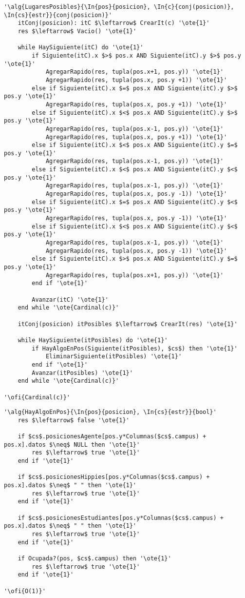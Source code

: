 \begin{lstlisting}[mathescape]
'\alg{LugaresPosibles}{\In{pos}{posicion}, \In{c}{conj(posicion)}, \In{cs}{estr}}{conj(posicion)}'
	itConj(posicion): itC $\leftarrow$ CrearIt(c) '\ote{1}'
	res $\leftarrow$ Vacio() '\ote{1}'

	while HaySiguiente(itC) do '\ote{1}'
		if Siguiente(itC).x $>$ pos.x AND Siguiente(itC).y $>$ pos.y '\ote{1}'
			AgregarRapido(res, tupla(pos.x+1, pos.y)) '\ote{1}'
			AgregarRapido(res, tupla(pos.x, pos.y +1)) '\ote{1}'
		else if Siguiente(itC).x $=$ pos.x AND Siguiente(itC).y $>$ pos.y '\ote{1}'
			AgregarRapido(res, tupla(pos.x, pos.y +1)) '\ote{1}'
		else if Siguiente(itC).x $<$ pos.x AND Siguiente(itC).y $>$ pos.y '\ote{1}'
			AgregarRapido(res, tupla(pos.x-1, pos.y)) '\ote{1}'
			AgregarRapido(res, tupla(pos.x, pos.y +1)) '\ote{1}'
		else if Siguiente(itC).x $<$ pos.x AND Siguiente(itC).y $=$ pos.y '\ote{1}'
			AgregarRapido(res, tupla(pos.x-1, pos.y)) '\ote{1}'
		else if Siguiente(itC).x $<$ pos.x AND Siguiente(itC).y $<$ pos.y '\ote{1}'
			AgregarRapido(res, tupla(pos.x-1, pos.y)) '\ote{1}'
			AgregarRapido(res, tupla(pos.x, pos.y -1)) '\ote{1}'
		else if Siguiente(itC).x $=$ pos.x AND Siguiente(itC).y $<$ pos.y '\ote{1}'
			AgregarRapido(res, tupla(pos.x, pos.y -1)) '\ote{1}'
		else if Siguiente(itC).x $<$ pos.x AND Siguiente(itC).y $<$ pos.y '\ote{1}'
			AgregarRapido(res, tupla(pos.x-1, pos.y)) '\ote{1}'
			AgregarRapido(res, tupla(pos.x, pos.y -1)) '\ote{1}'
		else if Siguiente(itC).x $>$ pos.x AND Siguiente(itC).y $=$ pos.y '\ote{1}'
			AgregarRapido(res, tupla(pos.x+1, pos.y)) '\ote{1}'
		end if '\ote{1}'

		Avanzar(itC) '\ote{1}'
	end while '\ote{Cardinal(c)}'

	itConj(posicion) itPosibles $\leftarrow$ CrearIt(res) '\ote{1}'

	while HaySiguiente(itPosibles) do '\ote{1}'
		if HayAlgoEnPos(Siguiente(itPosibles), $cs$) then '\ote{1}'
			EliminarSiguiente(itPosibles) '\ote{1}'
		end if '\ote{1}'
		Avanzar(itPosibles) '\ote{1}'
	end while '\ote{Cardinal(c)}'

'\ofi{Cardinal(c)}'
\end{lstlisting}

\begin{lstlisting}[mathescape]
'\alg{HayAlgoEnPos}{\In{pos}{posicion}, \In{cs}{estr}}{bool}'
	res $\leftarrow$ false '\ote{1}'

	if $cs$.posicionesAgente[pos.y*Columnas($cs$.campus) + pos.x].datos $\neq$ NULL then '\ote{1}'
		res $\leftarrow$ true '\ote{1}'
	end if '\ote{1}'

	if $cs$.posicionesHippies[pos.y*Columnas($cs$.campus) + pos.x].datos $\neq$ " " then '\ote{1}'
		res $\leftarrow$ true '\ote{1}'
	end if '\ote{1}'

	if $cs$.posicionesEstudiantes[pos.y*Columnas($cs$.campus) + pos.x].datos $\neq$ " " then '\ote{1}'
		res $\leftarrow$ true '\ote{1}'
	end if '\ote{1}'

	if Ocupada?(pos, $cs$.campus) then '\ote{1}'
		res $\leftarrow$ true '\ote{1}'
	end if '\ote{1}'

'\ofi{O(1)}'
\end{lstlisting}

